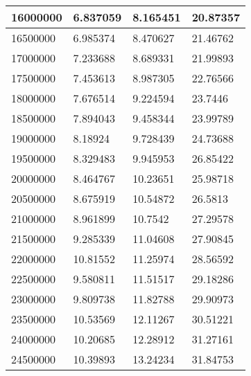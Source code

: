 \begin{table}[]
\begin{tabular}{ll|l|l|}
\multicolumn{1}{|l|}{16000000}       & 6.837059       & 8.165451           & 20.87357           \\ \hline
\multicolumn{1}{|l|}{16500000}       & 6.985374       & 8.470627           & 21.46762           \\ \hline
\multicolumn{1}{|l|}{17000000}       & 7.233688       & 8.689331           & 21.99893           \\ \hline
\multicolumn{1}{|l|}{17500000}       & 7.453613       & 8.987305           & 22.76566           \\ \hline
\multicolumn{1}{|l|}{18000000}       & 7.676514       & 9.224594           & 23.7446            \\ \hline
\multicolumn{1}{|l|}{18500000}       & 7.894043       & 9.458344           & 23.99789           \\ \hline
\multicolumn{1}{|l|}{19000000}       & 8.18924        & 9.728439           & 24.73688           \\ \hline
\multicolumn{1}{|l|}{19500000}       & 8.329483       & 9.945953           & 26.85422           \\ \hline
\multicolumn{1}{|l|}{20000000}       & 8.464767       & 10.23651           & 25.98718           \\ \hline
\multicolumn{1}{|l|}{20500000}       & 8.675919       & 10.54872           & 26.5813            \\ \hline
\multicolumn{1}{|l|}{21000000}       & 8.961899       & 10.7542            & 27.29578           \\ \hline
\multicolumn{1}{|l|}{21500000}       & 9.285339       & 11.04608           & 27.90845           \\ \hline
\multicolumn{1}{|l|}{22000000}       & 10.81552       & 11.25974           & 28.56592           \\ \hline
\multicolumn{1}{|l|}{22500000}       & 9.580811       & 11.51517           & 29.18286           \\ \hline
\multicolumn{1}{|l|}{23000000}       & 9.809738       & 11.82788           & 29.90973           \\ \hline
\multicolumn{1}{|l|}{23500000}       & 10.53569       & 12.11267           & 30.51221           \\ \hline
\multicolumn{1}{|l|}{24000000}       & 10.20685       & 12.28912           & 31.27161           \\ \hline
\multicolumn{1}{|l|}{24500000}       & 10.39893       & 13.24234           & 31.84753           \\ \hline
\end{tabular}

\end{table}
